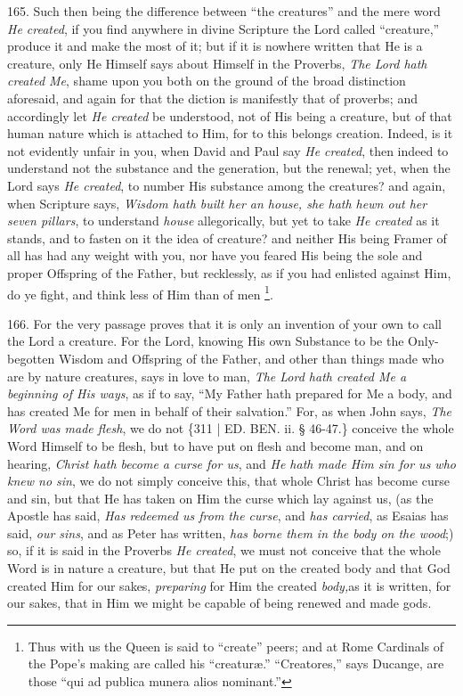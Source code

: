 165. Such then being the
difference between ``the creatures'' and the mere word \emph{He
created}, if you find anywhere in divine Scripture the Lord called ``creature,''
produce it and make the most of it; but if it is nowhere written that
He is a creature, only He Himself says about Himself in the Proverbs, \emph{The
Lord hath created Me}, shame upon you both on the ground of the
broad distinction aforesaid, and again for that the diction is
manifestly that of proverbs; and accordingly let \emph{He created} be
understood, not of His being a creature, but of that human nature
which is attached to Him, for to this belongs creation. Indeed, is it
not evidently unfair in you, when David and Paul say \emph{He created},
then indeed to understand not the substance and the generation, but
the renewal; yet, when the Lord says \emph{He created}, to number His
substance among the creatures? and again, when Scripture says, \emph{Wisdom
hath built her an house, she hath hewn out her seven pillars}, to
understand \emph{house} allegorically, but yet to take \emph{He created}
as it stands, and to fasten on it the idea of creature? and neither
His being Framer of all has had any weight with you, nor have you
feared His being the sole and proper Offspring of the Father, but
recklessly, as if you had enlisted against Him, do ye fight, and think
less of Him than of men \footnote{Thus with us the Queen is said to ``create'' peers; and at Rome
Cardinals of the Pope's making are called his ``creaturæ.'' ``Creatores,''
says Ducange, are those ``qui ad publica munera alios nominant.''}.

166. For the very passage
proves that it is only an invention of your own to call the Lord a
creature. For the Lord, knowing His own Substance to be the
Only-begotten Wisdom and Offspring of the Father, and other than
things made who are by nature creatures, says in love to man, \emph{The
Lord hath created Me a beginning of His ways}, as if to say, ``My
Father hath prepared for Me a body, and has created Me for men in
behalf of their salvation.'' For, as when John says, \emph{The Word was
made flesh}, we do not \{311 | ED. BEN. ii. § 46-47.\}
conceive the whole Word Himself to be flesh, but to have put on flesh
and become man, and on hearing, \emph{Christ hath become a curse for us},
and \emph{He hath made Him sin for us who knew no sin}, we do not
simply conceive this, that whole Christ has become curse and sin, but
that He has taken on Him the curse which lay against us, (as the
Apostle has said, \emph{Has redeemed us from the curse}, and \emph{has
carried}, as Esaias has said, \emph{our sins}, and as Peter has
written, \emph{has borne them in the body on the wood};) so, if it is
said in the Proverbs \emph{He created}, we must not conceive that the
whole Word is in nature a creature, but that He put on the created
body and that God created Him for our sakes, \emph{preparing} for Him
the created \emph{body,}as it is written, for our sakes, that in Him
we might be capable of being renewed and made gods.

